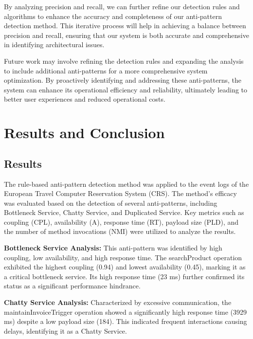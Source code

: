 \documentclass[12pt, times]{article}
\begin{document}
	\hspace*{5mm} By analyzing precision and recall, we can further refine our detection rules and algorithms to enhance the accuracy and completeness of our anti-pattern detection method. This iterative process will help in achieving a balance between precision and recall, ensuring that our system is both accurate and comprehensive in identifying architectural issues.
	
	\hspace*{5mm} Future work may involve refining the detection rules and expanding the analysis to include additional anti-patterns for a more comprehensive system optimization. By proactively identifying and addressing these anti-patterns, the system can enhance its operational efficiency and reliability, ultimately leading to better user experiences and reduced operational costs.
	

	\clearpage
	\newpage	
	\section*{Results and Conclusion}
	
	\subsection*{Results}
	
	\hspace*{5mm} The rule-based anti-pattern detection method was applied to the event logs of the European Travel Computer Reservation System (CRS). The method's efficacy was evaluated based on the detection of several anti-patterns, including Bottleneck Service, Chatty Service, and Duplicated Service. Key metrics such as coupling (CPL), availability (A), response time (RT), payload size (PLD), and the number of method invocations (NMI) were utilized to analyze the results.
	
	\hspace*{5mm} \textbf{Bottleneck Service Analysis:} This anti-pattern was identified by high coupling, low availability, and high response time. The searchProduct operation exhibited the highest coupling (0.94) and lowest availability (0.45), marking it as a critical bottleneck service. Its high response time (23 ms) further confirmed its status as a significant performance hindrance.
	
	\hspace*{5mm}\textbf{ Chatty Service Analysis:} Characterized by excessive communication, the maintainInvoiceTrigger operation showed a significantly high response time (3929 ms) despite a low payload size (184). This indicated frequent interactions causing delays, identifying it as a Chatty Service.
	
\end{document}
